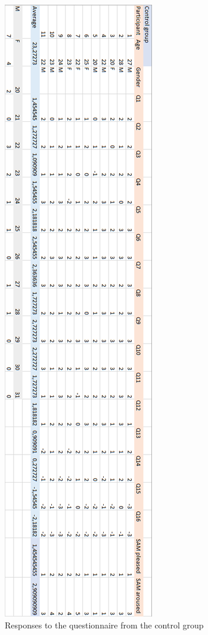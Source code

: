 \begin{figure}[h!]
    \centering
    \includegraphics[scale=0.65]{figures/questionnaire_results_control.png}
    \caption{Responses to the questionnaire from the control group}\label{fig:responses_control}
\end{figure}

